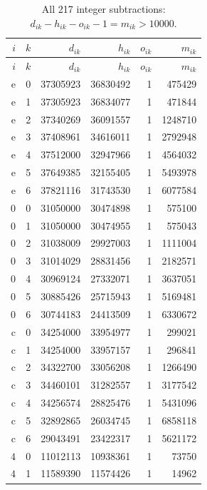 {\scriptsize
\setlength{\tabcolsep}{3pt}
\begin{longtable}{rrrrrr}
\caption{All 217 integer subtractions: $d_{ik}-h_{ik}-o_{ik}-1=m_{ik}>10000$.}\label{tab:even-components}\\
\toprule $i$ & $k$ & $d_{ik}$ & $h_{ik}$ & $o_{ik}$ & $m_{ik}$\\ \midrule
\endfirsthead
\toprule $i$ & $k$ & $d_{ik}$ & $h_{ik}$ & $o_{ik}$ & $m_{ik}$\\ \midrule
\endhead
\bottomrule\endfoot
$\mathrm e$ & 0 & 37305923 & 36830492 & 1 & 475429\\
$\mathrm e$ & 1 & 37305923 & 36834077 & 1 & 471844\\
$\mathrm e$ & 2 & 37340269 & 36091557 & 1 & 1248710\\
$\mathrm e$ & 3 & 37408961 & 34616011 & 1 & 2792948\\
$\mathrm e$ & 4 & 37512000 & 32947966 & 1 & 4564032\\
$\mathrm e$ & 5 & 37649385 & 32155405 & 1 & 5493978\\
$\mathrm e$ & 6 & 37821116 & 31743530 & 1 & 6077584\\
$0$ & 0 & 31050000 & 30474898 & 1 & 575100\\
$0$ & 1 & 31050000 & 30474955 & 1 & 575043\\
$0$ & 2 & 31038009 & 29927003 & 1 & 1111004\\
$0$ & 3 & 31014029 & 28831456 & 1 & 2182571\\
$0$ & 4 & 30969124 & 27332071 & 1 & 3637051\\
$0$ & 5 & 30885426 & 25715943 & 1 & 5169481\\
$0$ & 6 & 30744183 & 24413509 & 1 & 6330672\\
$\mathrm c$ & 0 & 34254000 & 33954977 & 1 & 299021\\
$\mathrm c$ & 1 & 34254000 & 33957157 & 1 & 296841\\
$\mathrm c$ & 2 & 34322700 & 33056208 & 1 & 1266490\\
$\mathrm c$ & 3 & 34460101 & 31282557 & 1 & 3177542\\
$\mathrm c$ & 4 & 34256574 & 28825476 & 1 & 5431096\\
$\mathrm c$ & 5 & 32892865 & 26034745 & 1 & 6858118\\
$\mathrm c$ & 6 & 29043491 & 23422317 & 1 & 5621172\\
$4$ & 0 & 11012113 & 10938361 & 1 & 73750\\
$4$ & 1 & 11589390 & 11574426 & 1 & 14962\\

\end{longtable}}
